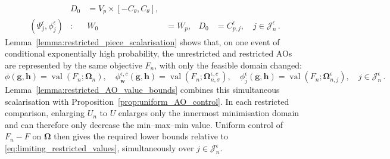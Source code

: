 \documentclass{article}
\theoremstyle{definition}
\newcommand*{\bb}{\boldsymbol}
\def\bw {\bb{w}}
\def\bh{\bb{h}}
\def\bg{\bb{g}}
\begin{document}
\begin{bibunit}
\begin{equation}
\begin{aligned}
    &
    D_0&=V_p\times[-C_\theta,C_\theta],
    \\
    (\Psi_j^\epsilon,\phi_j^\epsilon)
    &: &
    W_0&=W_p,
    &
    D_0&=C_{p,j}^\epsilon,
    \quad j\in\mathcal J_n^\epsilon \,.
\end{aligned}
\end{equation}
Lemma~\ref{lemma:restricted_piece_scalarisation} shows that, on one event of
conditional exponentially high probability, the unrestricted and
restricted AOs are represented by the same objective $F_n$, with only the
feasible domain changed:
$$
    \phi(\bg,\bh)
    =
    \operatorname{val}(F_n;\bb\Omega_n),
    \quad
    \phi_{\bw}^{\epsilon,c}(\bg,\bh)
    =
    \operatorname{val}(F_n;\bb\Omega_{n,\sigma}^{\epsilon,c}), \quad
    \phi_j^\epsilon(\bg,\bh)
    =
    \operatorname{val}(F_n;\bb\Omega_{n,j}^{\epsilon}),
    \quad j\in\mathcal J_n^\epsilon \,.
$$
Lemma~\ref{lemma:restricted_AO_value_bounds} combines this simultaneous
scalarisation with Proposition~\ref{prop:uniform_AO_control}. In each
restricted comparison, enlarging $U_n$ to $U$ enlarges only the innermost
minimisation domain and can therefore only decrease the min--max--min value.
Uniform control of $F_n-F$ on $\bb\Omega$ then gives the required lower
bounds relative to \eqref{eq:limiting_restricted_values}, simultaneously
over $j\in\mathcal J_n^\epsilon$.



\end{bibunit}
\end{document}
